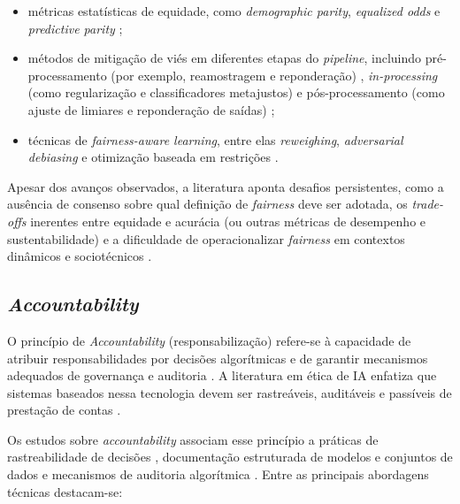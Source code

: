 \begin{itemize}
    \item métricas estatísticas de equidade, como \textit{demographic parity}, \textit{equalized odds} e \textit{predictive parity} \cite{Verma2018, Hardt2016, Dwork2006, S003, S004};
    \item métodos de mitigação de viés em diferentes etapas do \textit{pipeline}, incluindo pré-processamento (por exemplo, reamostragem e reponderação) \cite{Bellamy2019, Feldman2015, S003}, \textit{in-processing} (como regularização e classificadores metajustos) \cite{Bellamy2019, S040} e pós-processamento (como ajuste de limiares e reponderação de saídas) \cite{Hardt2016, Bellamy2019, S015};
    \item técnicas de \textit{fairness-aware learning}, entre elas \textit{reweighing}, \textit{adversarial debiasing} e otimização baseada em restrições \cite{Bellamy2019, S003, S040}.
\end{itemize}

Apesar dos avanços observados, a literatura aponta desafios persistentes, como a ausência de consenso sobre qual definição de \textit{fairness} deve ser adotada, os \textit{trade-offs} inerentes entre equidade e acurácia (ou outras métricas de desempenho e sustentabilidade) e a dificuldade de operacionalizar \textit{fairness} em contextos dinâmicos e sociotécnicos \cite{Corbett-Davies2023, Mittelstadt2019, S034, S040}.

\subsection{\textit{Accountability}}
\label{sec:accountability}

O princípio de \textit{Accountability} (responsabilização) refere-se à capacidade de atribuir responsabilidades por decisões algorítmicas e de garantir mecanismos adequados de governança e auditoria \cite{Diakopoulos2016,Kroll2017}. A literatura em ética de IA enfatiza que sistemas baseados nessa tecnologia devem ser rastreáveis, auditáveis e passíveis de prestação de contas \cite{Wieringa2020}.

Os estudos sobre \textit{accountability} associam esse princípio a práticas de rastreabilidade de decisões \cite{Kroll2017, Diakopoulos2016, S008, S016}, documentação estruturada de modelos e conjuntos de dados \cite{Mitchell2019, Gebru2021, S018, S037} e mecanismos de auditoria algorítmica \cite{Raji2020, Wieringa2020, S005, S046}. Entre as principais abordagens técnicas destacam-se:

